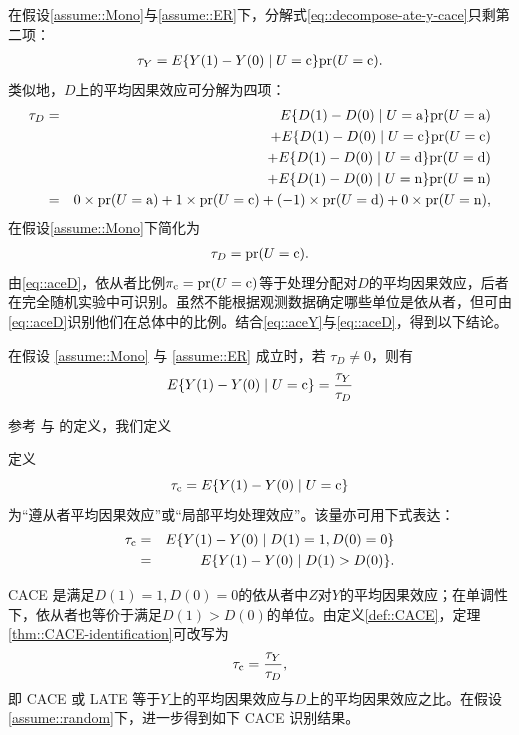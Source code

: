 在假设\ref{assume::Mono}与\ref{assume::ER}下，分解式\eqref{eq::decompose-ate-y-cace}只剩第二项：
\begin{eqnarray}
\label{eq::aceY}
\tau_Y  = E\{ Y(1) - Y(0) \mid U=\textup{c}   \} \textup{pr}(U = \textup{c} ).
\end{eqnarray}
类似地，$D$上的平均因果效应可分解为四项：
\begin{eqnarray*}
\tau_D &=& E\{ D(1) - D(0) \mid U=\textup{a}  \} \textup{pr}(U = \textup{a} ) \\
&&+ E\{ D(1) - D(0) \mid U=\textup{c}   \} \textup{pr}(U = \textup{c} ) \\
&&+ E\{ D(1) - D(0) \mid U=\textup{d}  \} \textup{pr}(U = \textup{d} ) \\
&&+ E\{ D(1) - D(0) \mid U=\textup{n}  \} \textup{pr}(U = \textup{n} )  \\
&=& 0\times \textup{pr}(U = \textup{a} ) 
+ 1 \times \textup{pr}(U = \textup{c} ) 
+ (-1)\times   \textup{pr}(U = \textup{d} )
+ 0 \times  \textup{pr}(U = \textup{n} ) ,
\end{eqnarray*}
在假设\ref{assume::Mono}下简化为
\begin{eqnarray}
\label{eq::aceD}
\tau_D  = \textup{pr}(U = \textup{c} ) .
\end{eqnarray}
由\eqref{eq::aceD}，依从者比例$\pi_{\textup{c}} = \textup{pr}(U = \textup{c})$等于处理分配对$D$的平均因果效应，后者在完全随机实验中可识别。虽然不能根据观测数据确定哪些单位是依从者，但可由\eqref{eq::aceD}识别他们在总体中的比例。结合\eqref{eq::aceY}与\eqref{eq::aceD}，得到以下结论。


\begin{theorem}
\label{thm::CACE-identification}
在假设 \ref{assume::Mono} 与 \ref{assume::ER} 成立时，若 $\tau_D \neq 0$，则有 
$$
E\{ Y(1) - Y(0) \mid U=\textup{c}   \} = \frac{ \tau_Y  }{ \tau_D}
$$ 
\end{theorem}


 

参考 \citet{imbens1994identification} 与 \citet{angrist1996identification} 的定义，我们定义

\begin{definition}\label{def::CACE}
定义 
$$
\tau_{\textup{c}}  =  E\{ Y(1) - Y(0) \mid U=\textup{c}   \}  
$$
为“遵从者平均因果效应”或“局部平均处理效应”。该量亦可用下式表达：
\begin{eqnarray*}
\tau_{\textup{c}}  &=&  E\{ Y(1) - Y(0) \mid D(1) = 1 , D(0) = 0  \} \\
&=&    E\{ Y(1) - Y(0) \mid D(1)  >  D(0)    \} . 
\end{eqnarray*}
\end{definition}

CACE 是满足$ D(1) = 1 , D(0) = 0$的依从者中$Z$对$Y$的平均因果效应；在单调性下，依从者也等价于满足$ D(1)  >  D(0)$的单位。由定义\ref{def::CACE}，定理\ref{thm::CACE-identification}可改写为
$$
\tau_{\textup{c}}  = \frac{ \tau_Y  }{ \tau_D} ,
$$
即 CACE 或 LATE 等于$Y$上的平均因果效应与$D$上的平均因果效应之比。在假设\ref{assume::random}下，进一步得到如下 CACE 识别结果。


